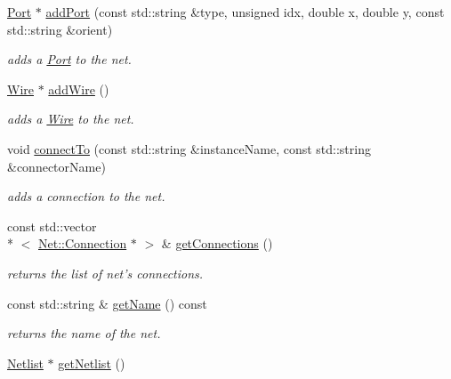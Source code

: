 \begin{DoxyCompactItemize}
\item 
\hyperlink{class_open_chams_1_1_port}{Port} $\ast$ \hyperlink{class_open_chams_1_1_net_af395a7c9d6f3c2b24500b91260873664}{add\-Port} (const std\-::string \&type, unsigned idx, double x, double y, const std\-::string \&orient)
\begin{DoxyCompactList}\small\item\em adds a \hyperlink{class_open_chams_1_1_port}{Port} to the net. \end{DoxyCompactList}\item 
\hyperlink{class_open_chams_1_1_wire}{Wire} $\ast$ \hyperlink{class_open_chams_1_1_net_a643a969f62770301b8b70ed63c36a55e}{add\-Wire} ()
\begin{DoxyCompactList}\small\item\em adds a \hyperlink{class_open_chams_1_1_wire}{Wire} to the net. \end{DoxyCompactList}\item 
void \hyperlink{class_open_chams_1_1_net_a40c2c019175ba3bfa4b90f4ad5d06483}{connect\-To} (const std\-::string \&instance\-Name, const std\-::string \&connector\-Name)
\begin{DoxyCompactList}\small\item\em adds a connection to the net. \end{DoxyCompactList}\item 
\hypertarget{class_open_chams_1_1_net_a87e7c71b25171dd479af0488865c8179}{const std\-::vector\\*
$<$ \hyperlink{class_open_chams_1_1_net_1_1_connection}{Net\-::\-Connection} $\ast$ $>$ \& \hyperlink{class_open_chams_1_1_net_a87e7c71b25171dd479af0488865c8179}{get\-Connections} ()}\label{class_open_chams_1_1_net_a87e7c71b25171dd479af0488865c8179}

\begin{DoxyCompactList}\small\item\em returns the list of net's connections. \end{DoxyCompactList}\item 
\hypertarget{class_open_chams_1_1_net_aef436e6e20d1dbf2eb78b089ca9d0794}{const std\-::string \& \hyperlink{class_open_chams_1_1_net_aef436e6e20d1dbf2eb78b089ca9d0794}{get\-Name} () const }\label{class_open_chams_1_1_net_aef436e6e20d1dbf2eb78b089ca9d0794}

\begin{DoxyCompactList}\small\item\em returns the name of the net. \end{DoxyCompactList}\item 
\hypertarget{class_open_chams_1_1_net_a4085d6a7b6958ffdd7ab5df7e6d6e53f}{\hyperlink{class_open_chams_1_1_netlist}{Netlist} $\ast$ \hyperlink{class_open_chams_1_1_net_a4085d6a7b6958ffdd7ab5df7e6d6e53f}{get\-Netlist} ()}\label{class_open_chams_1_1_net_a4085d6a7b6958ffdd7ab5df7e6d6e53f}


\end{DoxyCompactItemize}
